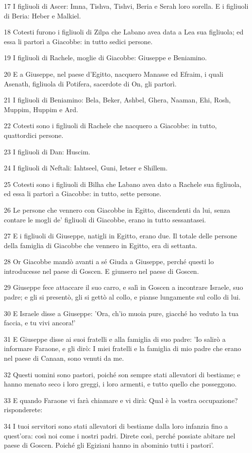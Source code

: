\par 17 I figliuoli di Ascer: Imna, Tishva, Tishvi, Beria e Serah loro sorella. E i figliuoli di Beria: Heber e Malkiel.
\par 18 Cotesti furono i figliuoli di Zilpa che Labano avea data a Lea sua figliuola; ed essa li partorì a Giacobbe: in tutto sedici persone.
\par 19 I figliuoli di Rachele, moglie di Giacobbe: Giuseppe e Beniamino.
\par 20 E a Giuseppe, nel paese d'Egitto, nacquero Manasse ed Efraim, i quali Asenath, figliuola di Potifera, sacerdote di On, gli partorì.
\par 21 I figliuoli di Beniamino: Bela, Beker, Ashbel, Ghera, Naaman, Ehi, Rosh, Muppim, Huppim e Ard.
\par 22 Cotesti sono i figliuoli di Rachele che nacquero a Giacobbe: in tutto, quattordici persone.
\par 23 I figliuoli di Dan: Huscim.
\par 24 I figliuoli di Neftali: Iahtseel, Guni, Ietser e Shillem.
\par 25 Cotesti sono i figliuoli di Bilha che Labano avea dato a Rachele sua figliuola, ed essa li partorì a Giacobbe: in tutto, sette persone.
\par 26 Le persone che vennero con Giacobbe in Egitto, discendenti da lui, senza contare le mogli de' figliuoli di Giacobbe, erano in tutto sessantasei.
\par 27 E i figliuoli di Giuseppe, natigli in Egitto, erano due. Il totale delle persone della famiglia di Giacobbe che vennero in Egitto, era di settanta.
\par 28 Or Giacobbe mandò avanti a sé Giuda a Giuseppe, perché questi lo introducesse nel paese di Goscen. E giunsero nel paese di Goscen.
\par 29 Giuseppe fece attaccare il suo carro, e salì in Goscen a incontrare Israele, suo padre; e gli si presentò, gli si gettò al collo, e pianse lungamente sul collo di lui.
\par 30 E Israele disse a Giuseppe: 'Ora, ch'io muoia pure, giacché ho veduto la tua faccia, e tu vivi ancora!'
\par 31 E Giuseppe disse ai suoi fratelli e alla famiglia di suo padre: 'Io salirò a informare Faraone, e gli dirò: I miei fratelli e la famiglia di mio padre che erano nel paese di Canaan, sono venuti da me.
\par 32 Questi uomini sono pastori, poiché son sempre stati allevatori di bestiame; e hanno menato seco i loro greggi, i loro armenti, e tutto quello che posseggono.
\par 33 E quando Faraone vi farà chiamare e vi dirà: Qual è la vostra occupazione? risponderete:
\par 34 I tuoi servitori sono stati allevatori di bestiame dalla loro infanzia fino a quest'ora: così noi come i nostri padri. Direte così, perché possiate abitare nel paese di Goscen. Poiché gli Egiziani hanno in abominio tutti i pastori'.


